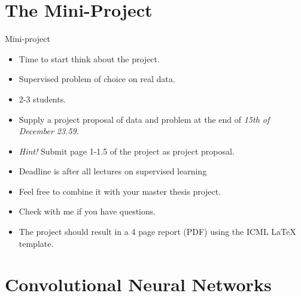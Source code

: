 \documentclass[10pt]{beamer}
\begin{document}
\section{The Mini-Project}


\begin{frame}{Mini-project}

\begin{itemize}
\item Time to start think about the project.\pause
\item {\color{uured} Supervised} problem of choice on {\color{uured} real data}.\pause
\item 2-3 students.\pause
\item Supply a {\color{uured} project proposal} of data and problem at the end of \emph{15th of December 23.59}.
\item \emph{Hint!} Submit page 1-1.5 of the project as project proposal.
\item Deadline is after all lectures on supervised learning\pause
\item Feel free to combine it with your master thesis project.\pause
\item Check with me if you have questions.
\item The project should result in a 4 page report (PDF) using the {\color{uured} ICML LaTeX template}.
\end{itemize}
\end{frame}


\section{Convolutional Neural Networks}

\end{document}
